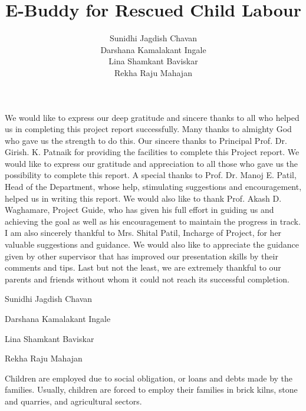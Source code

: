 \documentclass{SSBT-BE}
\begin{document}
\title{E-Buddy for Rescued Child Labour}
\author{Sunidhi Jagdish Chavan\\Darshana Kamalakant Ingale \\Lina Shamkant Baviskar \\ Rekha Raju Mahajan }




\beforepreface
{}
We would like to express our deep gratitude and sincere thanks to all who helped us in completing this project report successfully. Many thanks to almighty God who gave us the strength to do this. Our sincere thanks to Principal Prof. Dr. Girish. K. Patnaik for providing the facilities to complete this Project report. We would like to express our gratitude and appreciation to all those who gave us the possibility to complete this report. A special thanks to Prof. Dr. Manoj E. Patil, Head of the Department, whose help, stimulating suggestions and encouragement, helped us in writing this report. We would also like to thank Prof. Akash D. Waghamare, Project Guide, who has given his full effort in guiding us and achieving the goal as well as his encouragement to maintain the progress in track. I am also sincerely thankful to Mrs. Shital Patil, Incharge of Project, for her valuable suggestions and guidance. We would also like to appreciate the guidance given by other supervisor that has improved our presentation skills by their comments and tips. Last but not the least, we are extremely thankful to our parents and friends without whom it could not reach its successful completion.

\begin{flushright} 
Sunidhi Jagdish Chavan 
 
 Darshana Kamalakant Ingale
 
 Lina Shamkant Baviskar
 
 Rekha Raju Mahajan
 \end{flushright}

\printnomenclature




\newpage
\afterpreface
\listoffigures
\listoftables
%
\clearpage
{}
\pagestyle{plain}


Children are employed due to social obligation, or loans and debts made by the families. Usually, children are forced to employ their families in brick kilns, stone and quarries, and agricultural sectors.
\end{document}
